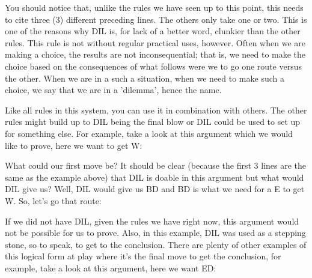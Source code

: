 You should notice that, unlike the rules we have seen up to this point, this needs to cite three (3) different preceding lines. The others only take one or two. This is one of the reasons why DIL is, for lack of a better word, clunkier than the other rules. This rule is not without regular practical uses, however. Often when we are making a choice, the results are not inconsequential; that is, we need to make the choice based on the consequences of what follows were we to go one route versus the other. When we are in a such a situation, when we need to make such a choice, we say that we are in a 'dilemma', hence the name.

Like all rules in this system, you can use it in combination with others. The other rules might build up to DIL being the final blow or DIL could be used to set up for something else. For example, take a look at this argument which we would like to prove, here we want to get W:
\begin{fitchproof}
\end{fitchproof}

What could our first move be? It should be clear (because the first 3 lines are the same as the example above) that DIL is doable in this argument but what would DIL give us? Well, DIL would give us B\eor D and B\eor D is what we need for a \eif E to get W. So, let's go that route:

\begin{fitchproof}
 
 
\end{fitchproof}

If we did not have DIL, given the rules we have right now, this argument would not be possible for us to prove. Also, in this example, DIL was used as a stepping stone, so to speak, to get to the conclusion. There are plenty of other examples of this logical form at play where it's the final move to get the conclusion, for example, take a look at this argument, here we want E\eor D:
\begin{fitchproof}
\end{fitchproof}

